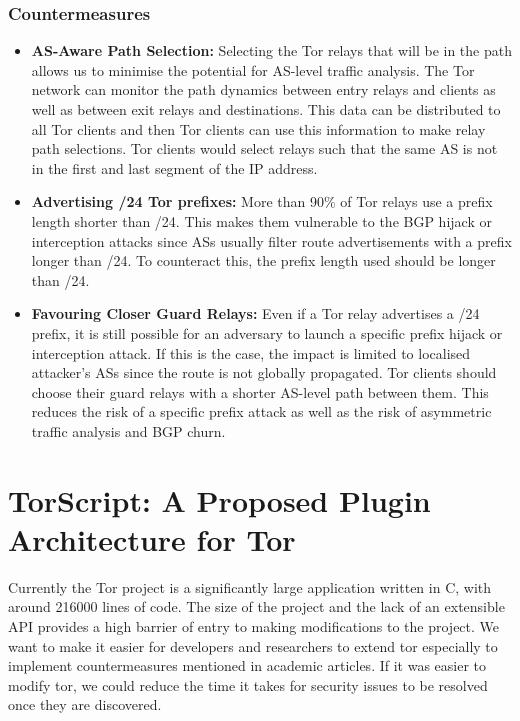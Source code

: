 \documentclass[9pt,technote]{IEEEtran}
\begin{document}
\subsubsection{Countermeasures}
\begin{itemize}
\item \textbf{AS-Aware Path Selection:} Selecting the Tor relays that will be in
	the path allows us to minimise the potential for AS-level traffic
	analysis. The Tor network can monitor the path dynamics between entry
	relays and clients as well as between exit relays and destinations. This
	data can be distributed to all Tor clients and then Tor clients can use
	this information to make relay path selections. Tor clients would select
	relays such that the same AS is not in the first and last segment of the IP
	address.
\item \textbf{Advertising /24 Tor prefixes:} More than 90\% of Tor relays use a
	prefix length shorter than /24. This makes them vulnerable to the BGP
	hijack or interception attacks since ASs usually filter route
	advertisements with a prefix longer than /24. To counteract this, the prefix length used should be longer than /24.
\item \textbf{Favouring Closer Guard Relays:} Even if a Tor relay advertises a
	/24 prefix, it is still possible for an adversary to launch a specific
	prefix hijack or interception attack. If this is the case, the impact is
	limited to localised attacker's ASs since the route is not globally
	propagated. Tor clients should choose their guard relays with a shorter
	AS-level path between them. This reduces the risk of a specific prefix
	attack as well as the risk of asymmetric traffic analysis and BGP churn.
\end{itemize}

\section{TorScript: A Proposed Plugin Architecture for Tor}
Currently the Tor project is a significantly large application written in C,
with around 216000 lines of code. The size of the project and the lack of an
extensible API provides a high barrier of entry to making modifications to the
project. We want to make it easier for developers and researchers to extend tor
especially to implement countermeasures mentioned in academic articles. If it
was easier to modify tor, we could reduce the time it takes for security issues
to be resolved once they are discovered.
\end{document}

